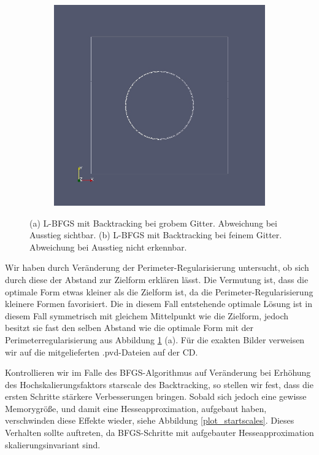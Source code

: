 \begin{figure}
\begin{subfigure}{0.5\textwidth}
	\includegraphics[scale=0.25]{pic_bigcircle_bfgs_linesearch_fine.jpg}
	\caption{}	
	\end{subfigure}
\caption{(a) L-BFGS mit Backtracking bei grobem Gitter. Abweichung bei Ausstieg sichtbar. (b) L-BFGS mit Backtracking bei feinem Gitter. Abweichung bei Ausstieg nicht erkennbar.}
\label{Konvergenzbfgscircle}
\end{figure}

Wir haben durch Veränderung der Perimeter-Regularisierung untersucht, ob sich durch diese der Abstand zur Zielform erklären lässt. Die Vermutung ist, dass die optimale Form etwas kleiner als die Zielform ist, da die Perimeter-Regularisierung kleinere Formen favorisiert. Die in diesem Fall entstehende optimale Lösung ist in diesem Fall symmetrisch mit gleichem Mittelpunkt wie die Zielform, jedoch besitzt sie fast den selben Abstand wie die optimale Form mit der Perimeterregularisierung aus Abbildung \ref{Konvergenzbfgscircle} (a). Für die exakten Bilder verweisen wir auf die mitgelieferten \textsf{.pvd}-Dateien auf der CD.

Kontrollieren wir im Falle des BFGS-Algorithmus auf Veränderung bei Erhöhung des Hochskalierungsfaktors \textsf{starscale} des Backtracking, so stellen wir fest, dass die ersten Schritte stärkere Verbesserungen bringen. Sobald sich jedoch eine gewisse Memorygröße, und damit eine Hesseapproximation, aufgebaut haben, verschwinden diese Effekte wieder, siehe Abbildung \ref{plot_startscales}. Dieses Verhalten sollte auftreten, da BFGS-Schritte mit aufgebauter Hesseapproximation skalierungsinvariant sind.

